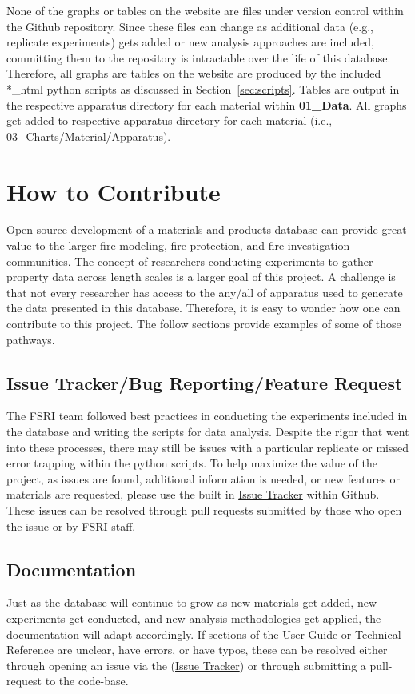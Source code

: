 \documentclass[12pt,oneside]{book}
\begin{document}
None of the graphs or tables on the website are files under version control within the Github repository. Since these files can change as additional data (e.g., replicate experiments) gets added or new analysis approaches are included, committing them to the repository is intractable over the life of this database. Therefore, all graphs are tables on the website are produced by the included *\_html python scripts as discussed in Section~\ref{sec:scripts}. Tables are output in the respective apparatus directory for each material within {\bf 01\_Data}. All graphs get added to respective apparatus directory for each material (i.e., 03\_Charts/Material/Apparatus).


\chapter{How to Contribute}
\label{sec:contribute}

Open source development of a materials and products database can provide great value to the larger fire modeling, fire protection, and fire investigation communities. The concept of researchers conducting experiments to gather property data across length scales is a larger goal of this project. A challenge is that not every researcher has access to the any/all of apparatus used to generate the data presented in this database. Therefore, it is easy to wonder how one can contribute to this project. The follow sections provide examples of some of those pathways.

\section{Issue Tracker/Bug Reporting/Feature Request}
The FSRI team followed best practices in conducting the experiments included in the database and writing the scripts for data analysis. Despite the rigor that went into these processes, there may still be issues with a particular replicate or missed error trapping within the python scripts. To help maximize the value of the project, as issues are found, additional information is needed, or new features or materials are requested, please use the built in \href{https://github.com/ulfsri/fsri_materials_database/issues}{Issue Tracker} within Github. These issues can be resolved through pull requests submitted by those who open the issue or by FSRI staff.

\section{Documentation}
Just as the database will continue to grow as new materials get added, new experiments get conducted, and new analysis methodologies get applied, the documentation will adapt accordingly. If sections of the User Guide or Technical Reference are unclear, have errors, or have typos, these can be resolved either through opening an issue via the (\href{https://github.com/ulfsri/fsri_materials_database/issues}{Issue Tracker}) or through submitting a pull-request to the code-base.
\end{document}
